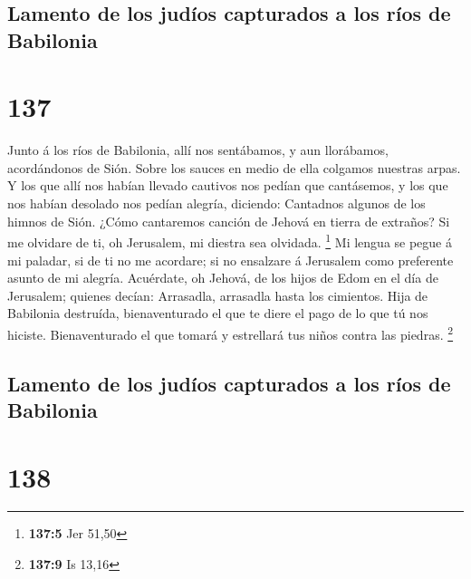 \hypertarget{lamento-de-los-juduxedos-capturados-a-los-ruxedos-de-babilonia}{%
\subsection{Lamento de los judíos capturados a los ríos de
Babilonia}\label{lamento-de-los-juduxedos-capturados-a-los-ruxedos-de-babilonia}}

\hypertarget{section-136}{%
\section{137}\label{section-136}}

 Junto á los ríos de Babilonia, allí nos sentábamos, y aun
llorábamos, acordándonos de Sión.  Sobre los sauces en medio
de ella colgamos nuestras arpas.  Y los que allí nos habían
llevado cautivos nos pedían que cantásemos, y los que nos habían
desolado nos pedían alegría, diciendo:  Cantadnos algunos de
los himnos de Sión. ¿Cómo cantaremos canción de Jehová en tierra de
extraños?  Si me olvidare de ti, oh Jerusalem, mi diestra
sea olvidada. \footnote{\textbf{137:5} Jer 51,50}  Mi lengua
se pegue á mi paladar, si de ti no me acordare; si no ensalzare á
Jerusalem como preferente asunto de mi alegría.  Acuérdate,
oh Jehová, de los hijos de Edom en el día de Jerusalem; quienes decían:
Arrasadla, arrasadla hasta los cimientos.  Hija de Babilonia
destruída, bienaventurado el que te diere el pago de lo que tú nos
hiciste.  Bienaventurado el que tomará y estrellará tus
niños contra las piedras. \footnote{\textbf{137:9} Is 13,16}

\hypertarget{lamento-de-los-juduxedos-capturados-a-los-ruxedos-de-babilonia-1}{%
\subsection{Lamento de los judíos capturados a los ríos de
Babilonia}\label{lamento-de-los-juduxedos-capturados-a-los-ruxedos-de-babilonia-1}}

\hypertarget{section-137}{%
\section{138}\label{section-137}}

